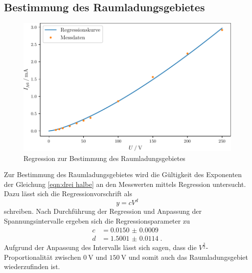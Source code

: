 \subsection{Bestimmung des Raumladungsgebietes}
\begin{figure}
    \centering
    \caption{Regression zur Bestimmung des Raumladungsgebietes}
    \label{fig:exponent}
    \includegraphics[width = \textwidth]{build/exponent.pdf}
\end{figure}
\noindent Zur Bestimmung des Raumladungsgebietes wird die Gültigkeit des Exponenten der Gleichung \eqref{eqn:drei halbe} an den Messwerten mittels Regression untersucht.
Dazu lässt sich die Regressionvorschrift als
\begin{equation}
    y = cV^d
\end{equation} 
schreiben.
Nach Durchführung der Regression und Anpassung der Spannungsintervalle ergeben sich die Regressionsparameter zu
\begin{align*}
    c & = \num{0.0150(9)} \\ 
    d & = \num{1.5001(114)} \; \text{.}
\end{align*}
Aufgrund der Anpassung des Intervalls lässt sich sagen, dass die $V^\frac{3}{2}$-Proportionalität zwischen $\SI{0}{\volt}$ und $\SI{150}{\volt}$ 
und somit auch das Raumladungsgebiet wiederzufinden ist.
